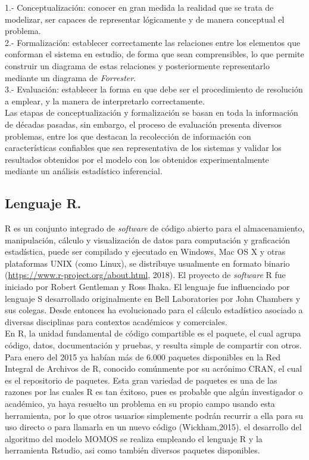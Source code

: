 1.- Conceptualizaci\'on: conocer en gran medida la realidad que se trata de modelizar, ser capaces de representar l\'ogicamente y de manera conceptual el problema. \\

2.- Formalizaci\'on: establecer correctamente las relaciones entre los elementos que conforman el sistema en estudio, de forma que sean comprensibles, lo que permite construir un diagrama de estas relaciones y posteriormente representarlo mediante un diagrama de \textit{Forrester}.\\

3.- Evaluaci\'on: establecer la forma en que debe ser el procedimiento de resoluci\'on a emplear, y la manera de interpretarlo correctamente.\\


Las etapas de conceptualizaci\'on y formalizaci\'on se basan en toda la informaci\'on de d\'ecadas pasadas, sin embargo, el proceso de evaluaci\'on presenta diversos problemas, entre los que destacan la recolecci\'on de informaci\'on con caracter\'isticas confiables que sea representativa de los sistemas y validar los resultados obtenidos por el modelo con los obtenidos experimentalmente mediante un an\'alisis estad\'istico inferencial.


\subsection{Lenguaje R.}

R es un conjunto  integrado de \textit{software} de c\'odigo abierto para el almacenamiento, manipulaci\'on, c\'alculo y visualizaci\'on de datos para computaci\'on y graficaci\'on estad\'istica, puede ser compilado y ejecutado en Windows, Mac OS X y otras  plataformas UNIX (como Linux), se distribuye usualmente en formato binario (\url{https://www.r-project.org/about.html}, 2018). El proyecto de \emph{software} R fue iniciado por Robert Gentleman y Ross Ihaka. El lenguaje fue influenciado por  lenguaje S desarrollado originalmente en Bell Laboratories por John Chambers y sus colegas. Desde entonces ha evolucionado  para el c\'alculo estad\'istico asociado a diversas disciplinas para contextos acad\'emicos y comerciales. \\

En R, la unidad fundamental de c\'odigo compartible es el paquete, el cual agrupa c\'odigo, datos, documentaci\'on y pruebas, y resulta simple de compartir con otros. Para enero del 2015 ya hab\'ian m\'as de 6.000 paquetes disponibles en la Red Integral de Archivos de R, conocido com\'unmente por su acr\'onimo CRAN, el cual es el repositorio de paquetes. Esta gran variedad de paquetes es una de las razones por las cuales R es tan \'exitoso, pues es probable que alg\'un investigador o acad\'emico, ya haya resuelto un problema en su propio campo usando esta herramienta, por lo que otros usuarios simplemente podr\'an recurrir a ella para su uso directo o para llamarla en un nuevo c\'odigo (Wickham,2015). el desarrollo del algoritmo del modelo MOMOS se realiza empleando el lenguaje R y la herramienta Rstudio, asi como también diversos paquetes disponibles. \\


